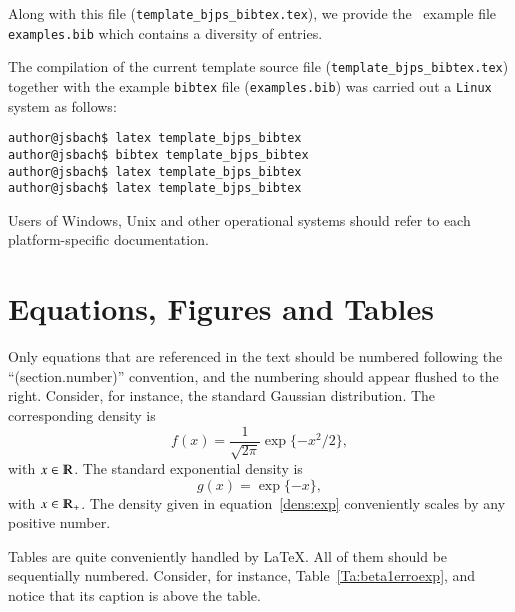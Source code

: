 \documentclass[12pt,twoside,reqno,final]{bjps}
\theoremstyle{plain}
\numberwithin{equation}{section}
\let\mathbb=\varmathbb
\def\R{{\mathbb R}}
\begin{document}
Along with this file (\verb+template_bjps_bibtex.tex+), we provide the \BibTeX\ example file \verb+examples.bib+ which contains a diversity of entries.

The compilation of the current template source file (\verb+template_bjps_bibtex.tex+) together with the example \verb+bibtex+ file 
(\verb+examples.bib+) was carried out a \texttt{Linux} system as follows:
\begin{verbatim}
author@jsbach$ latex template_bjps_bibtex
author@jsbach$ bibtex template_bjps_bibtex
author@jsbach$ latex template_bjps_bibtex
author@jsbach$ latex template_bjps_bibtex
\end{verbatim}

Users of Windows, Unix and other operational systems should refer to each platform-specific documentation.

\section{Equations, Figures and Tables}

Only equations that are referenced in the text should be numbered following the ``(section.number)'' convention, and the numbering should appear flushed to the right.
Consider, for instance, the standard Gaussian distribution. The corresponding density is
$$
f(x) = \frac1{\sqrt{2\pi}} \exp\{-{x^2}/{2} \},
$$
with $x \in \R$. The standard exponential density is
\begin{equation}
g(x) = \exp\{-x\},
\label{dens:exp}
\end{equation}
with $x \in \R_+$.
The density given in equation~\eqref{dens:exp} conveniently scales by any positive number.

Tables are quite conveniently handled by \LaTeX.
All of them should be sequentially numbered.
Consider, for instance, Table~\ref{Ta:beta1erroexp}, and notice that its caption is above the table.
\end{document}
